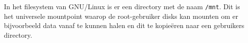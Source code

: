 In het filesystem van GNU/Linux is er een directory met de naam \texttt{/mnt}. Dit is het universele mountpoint waarop de root-gebruiker disks kan mounten om er bijvoorbeeld data vanaf te kunnen halen en dit te kopie\"eren naar een gebruikers directory.

